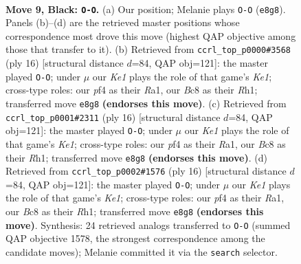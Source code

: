 \documentclass[11pt]{article}
\begin{document}
\clearpage

\begin{figure}[p]\centering
\begin{subfigure}{0.46\textwidth}\centering
\resizebox{\linewidth}{!}{%
\newchessgame
\chessboard[
  setfen={rnb1k2r/1ppn1ppp/p3p3/3pP3/1q1P1P1P/2N5/PPP3P1/1R1QKBNR b Kkq - 2 9},
  showmover=false,
  pgfstyle=straightmove, color=movearrow, markmove={e8-g8}
]}
\caption{}
\end{subfigure}\hfill
\begin{subfigure}{0.46\textwidth}\centering
\resizebox{\linewidth}{!}{%
\newchessgame
\chessboard[
  setfen={r1bqk2r/ppp2ppp/2n1p3/8/QnpP4/5NP1/PP2PPBP/RN2K2R w KQkq - 0 9},
  showmover=false,
  pgfstyle=straightmove, color=movearrow, markmove={e1-g1}
]}
\caption{}
\end{subfigure}
\\[4pt]
\begin{subfigure}{0.46\textwidth}\centering
\resizebox{\linewidth}{!}{%
\newchessgame
\chessboard[
  setfen={r1bqk2r/ppp2ppp/2n1p3/8/QnpP4/5NP1/PP2PPBP/RN2K2R w KQkq - 0 9},
  showmover=false,
  pgfstyle=straightmove, color=movearrow, markmove={e1-g1}
]}
\caption{}
\end{subfigure}\hfill
\begin{subfigure}{0.46\textwidth}\centering
\resizebox{\linewidth}{!}{%
\newchessgame
\chessboard[
  setfen={r1bqk2r/ppp2ppp/2n1p3/8/QnpP4/5NP1/PP2PPBP/RN2K2R w KQkq - 0 9},
  showmover=false,
  pgfstyle=straightmove, color=movearrow, markmove={e1-g1}
]}
\caption{}
\end{subfigure}
\caption{\textbf{Move 9, Black: \texttt{O-O}.} (a) Our position; Melanie plays \texttt{O-O} (\texttt{e8g8}). Panels (b)--(d) are the retrieved master positions whose correspondence most drove this move (highest QAP objective among those that transfer to it). (b) Retrieved from \texttt{ccrl\_top\_p0000\#3568} (ply 16) [structural distance $d$=84, QAP obj=121]: the master played \texttt{O-O}; under $\mu$ our \emph{Ke1} plays the role of that game's \emph{Ke1}; cross-type roles: our \emph{p}f4 as their \emph{R}a1, our \emph{B}c8 as their \emph{R}h1; transferred move \texttt{e8g8} \textbf{(endorses this move)}. (c) Retrieved from \texttt{ccrl\_top\_p0001\#2311} (ply 16) [structural distance $d$=84, QAP obj=121]: the master played \texttt{O-O}; under $\mu$ our \emph{Ke1} plays the role of that game's \emph{Ke1}; cross-type roles: our \emph{p}f4 as their \emph{R}a1, our \emph{B}c8 as their \emph{R}h1; transferred move \texttt{e8g8} \textbf{(endorses this move)}. (d) Retrieved from \texttt{ccrl\_top\_p0002\#1576} (ply 16) [structural distance $d$=84, QAP obj=121]: the master played \texttt{O-O}; under $\mu$ our \emph{Ke1} plays the role of that game's \emph{Ke1}; cross-type roles: our \emph{p}f4 as their \emph{R}a1, our \emph{B}c8 as their \emph{R}h1; transferred move \texttt{e8g8} \textbf{(endorses this move)}. Synthesis: 24 retrieved analogs transferred to \texttt{O-O} (summed QAP objective 1578, the strongest correspondence among the candidate moves); Melanie committed it via the \texttt{search} selector.}
\label{fig:thought-m17}
\end{figure}
\end{document}
